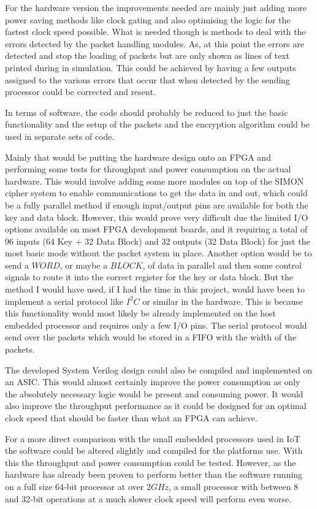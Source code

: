 \documentclass[12pt,twoside,a4paper]{report}
\begin{document}
	For the hardware version the improvements needed are mainly just adding more power saving methods like clock gating and also optimising the logic for the fastest clock speed possible. What is needed though is methods to deal with the errors detected by the packet handling modules. As, at this point the errors are detected and stop the loading of packets but are only shown as lines of text printed during in simulation. This could be achieved by having a few outputs assigned to the various errors that occur that when detected by the sending processor could be corrected and resent.
	
	In terms of software, the code should probably be reduced to just the basic functionality and the setup of the packets and the encryption algorithm could be used in separate sets of code. 
	
	Mainly that would be putting the hardware design onto an FPGA and performing some tests for throughput and power consumption on the actual hardware. This would involve adding some more modules on top of the SIMON cipher system to enable communications to get the data in and out, which could be a fully parallel method if enough input/output pins are available for both the key and data block. However, this would prove very difficult due the limited I/O options available on most FPGA development boards, and it requiring a total of 96 inputs (64 Key + 32 Data Block) and 32 outputs (32 Data Block) for just the most basic mode without the packet system in place. Another option would be to send a $WORD$, or maybe a $BLOCK$, of data in parallel and then some control signals to route it into the correct register for the key or data block. But the method I would have used, if I had the time in this project, would have been to implement a serial protocol like $I^2C$ or similar in the hardware. This is because this functionality would most likely be already implemented on the host embedded processor and requires only a few I/O pins. The serial protocol would send over the packets which would be stored in a FIFO with the width of the packets.
	
	The developed System Verilog design could also be compiled and implemented on an ASIC. This would almost certainly improve the power consumption as only the absolutely necessary  logic would be present and consuming power. It would also improve the throughput performance as it could be designed for an optimal clock speed that should be faster than what an FPGA can achieve.
	
	For a more direct comparison with the small embedded processors used in IoT the software could be altered slightly and compiled for the platforms use. With this the throughput and power consumption could be tested. However, as the hardware has already been proven to perform better than the software running on a full size 64-bit processor at over $2GHz$, a small processor with between 8 and 32-bit operations at a much slower clock speed will perform even worse.
	
	
	

	\appendix    
\end{document}
